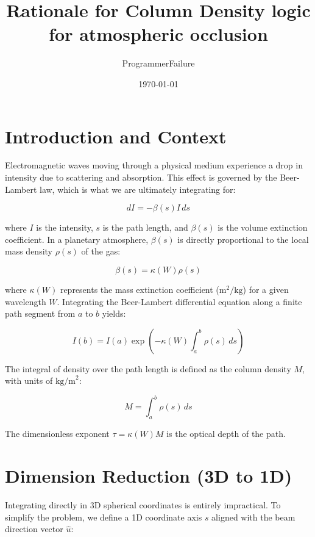 ﻿\documentclass[12pt,a4paper]{article}
\title{Rationale for Column Density logic for atmospheric occlusion}
\author{ProgrammerFailure}
\date{\today}
\begin{document}
\maketitle

\section{Introduction and Context}

Electromagnetic waves moving through a physical medium experience a drop in intensity due to scattering and absorption. This effect is governed by the Beer-Lambert law, which is what we are ultimately integrating for:

\begin{equation}
dI = - \beta(s) I \, ds
\end{equation}

where $I$ is the intensity, $s$ is the path length, and $\beta(s)$ is the volume extinction coefficient. In a planetary atmosphere, $\beta(s)$ is directly proportional to the local mass density $\rho(s)$ of the gas:

\begin{equation}
\beta(s) = \kappa(W) \rho(s)
\end{equation}

where $\kappa(W)$ represents the mass extinction coefficient ($\text{m}^2/\text{kg}$) for a given wavelength $W$. Integrating the Beer-Lambert differential equation along a finite path segment from $a$ to $b$ yields:

\begin{equation}
I(b) = I(a) \exp \left( -\kappa(W) \int_{a}^{b} \rho(s) \, ds \right)
\end{equation}

The integral of density over the path length is defined as the column density $M$, with units of $\text{kg/m}^2$:

\begin{equation}
M = \int_{a}^{b} \rho(s) \, ds
\end{equation}

The dimensionless exponent $\tau = \kappa(W) M$ is the optical depth of the path.

\section{Dimension Reduction (3D to 1D)}
Integrating directly in 3D spherical coordinates is entirely impractical. To simplify the problem, we define a 1D coordinate axis $s$ aligned with the beam direction vector $\hat{u}$:
\end{document}
